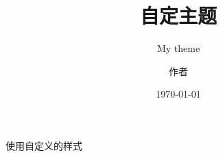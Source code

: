 \documentclass{ctexbeamer}
\begin{document}
    \title{自定主题}
    \subtitle{My theme}
    \author{作者}
    \date{\today}
    \maketitle
    \begin{frame}
        使用自定义的样式
    \end{frame}
    \makebottom
\end{document}

